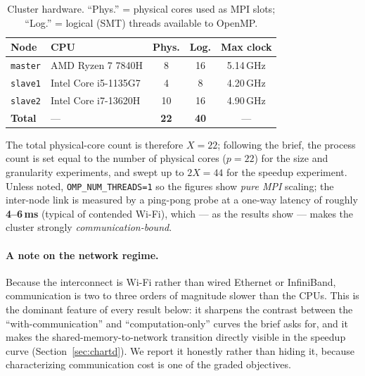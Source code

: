 \documentclass[11pt,a4paper]{article}
\newcommand{\code}[1]{\texttt{#1}}
\begin{document}
\begin{table}[H]
\centering\small
\caption{Cluster hardware. ``Phys.'' = physical cores used as MPI slots;
``Log.'' = logical (SMT) threads available to OpenMP.}\label{tab:cluster}
\begin{tabular}{@{}llccc@{}}
\toprule
Node & CPU & Phys. & Log. & Max clock \\
\midrule
\code{master} & AMD Ryzen 7 7840H        & 8  & 16 & 5.14\,GHz \\
\code{slave1} & Intel Core i5-1135G7     & 4  & 8  & 4.20\,GHz \\
\code{slave2} & Intel Core i7-13620H     & 10 & 16 & 4.90\,GHz \\
\midrule
\textbf{Total} & --- & \textbf{22} & \textbf{40} & --- \\
\bottomrule
\end{tabular}
\end{table}

\noindent
The total physical-core count is therefore $X=22$; following the brief, the
process count is set equal to the number of physical cores ($p=22$) for the
size and granularity experiments, and swept up to $2X=44$ for the speedup
experiment. Unless noted, \code{OMP\_NUM\_THREADS=1} so the figures show
\emph{pure MPI} scaling; the inter-node link is measured by a ping-pong probe at
a one-way latency of roughly \textbf{4--6\,ms} (typical of contended Wi-Fi),
which --- as the results show --- makes the cluster strongly
\emph{communication-bound}.

\paragraph{A note on the network regime.} Because the interconnect is Wi-Fi
rather than wired Ethernet or InfiniBand, communication is two to three orders of
magnitude slower than the CPUs. This is the dominant feature of every result
below: it sharpens the contrast between the ``with-communication'' and
``computation-only'' curves the brief asks for, and it makes the
shared-memory-to-network transition directly visible in the speedup curve
(Section~\ref{sec:chartd}). We report it honestly rather than hiding it, because
characterizing communication cost is one of the graded objectives.
\end{document}
